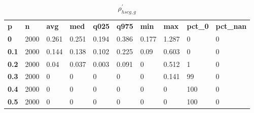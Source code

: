 \begin{table}[h]
 \centering 
\footnotesize
\caption{$\rho_{hscg,g}^\prime $}
\label{tab:alphahscgg}
\begin{tabular}[h]{| l l l l l l l l l l|
    } \hline
\textbf{ p} & \textbf{ n} & \textbf{ avg} & \textbf{ med} & \textbf{ q025} & \textbf{ q975} & \textbf{ min} & \textbf{ max} & \textbf{ pct\_0} & \textbf{ pct\_nan}
           \\
  \textbf{  0} & 2000 & 0.261 & 0.251 & 0.194 & 0.386 & 0.177 & 1.287 &   0 & 0
           \\
  \textbf{0.1} & 2000 & 0.144 & 0.138 & 0.102 & 0.225 &  0.09 & 0.603 &   0 & 0
           \\
  \textbf{0.2} & 2000 &  0.04 & 0.037 & 0.003 & 0.091 &     0 & 0.512 &   1 & 0
           \\
  \textbf{0.3} & 2000 &     0 &     0 &     0 &     0 &     0 & 0.141 &  99 & 0
           \\
  \textbf{0.4} & 2000 &     0 &     0 &     0 &     0 &     0 &     0 & 100 & 0
           \\
  \textbf{0.5} & 2000 &     0 &     0 &     0 &     0 &     0 &     0 & 100 & 0
           \\
 \hline \end{tabular}
 \end{table}
